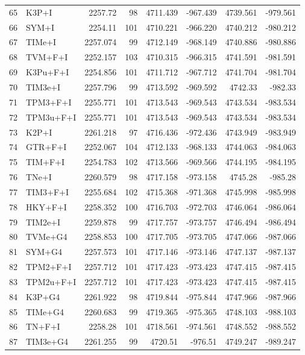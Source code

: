 \documentclass[12pt]{article}
\begin{document}
\begin{longtable}{clrrrrrr}
	65 & K3P+I & 2257.72 & 98 & 4711.439 & -967.439 & 4739.561 & -979.561 \\ 
	66 & SYM+I & 2254.11 & 101 & 4710.221 & -966.220 & 4740.212 & -980.212 \\ 
	67 & TIMe+I & 2257.074 & 99 & 4712.149 & -968.149 & 4740.886 & -980.886 \\ 
	68 & TVM+F+I & 2252.157 & 103 & 4710.315 & -966.315 & 4741.591 & -981.591 \\ 
	69 & K3Pu+F+I & 2254.856 & 101 & 4711.712 & -967.712 & 4741.704 & -981.704 \\ 
	70 & TIM3e+I & 2257.796 & 99 & 4713.592 & -969.592 & 4742.33 & -982.33 \\ 
	71 & TPM3+F+I & 2255.771 & 101 & 4713.543 & -969.543 & 4743.534 & -983.534 \\ 
	72 & TPM3u+F+I & 2255.771 & 101 & 4713.543 & -969.543 & 4743.534 & -983.534 \\ 
	73 & K2P+I & 2261.218 & 97 & 4716.436 & -972.436 & 4743.949 & -983.949 \\ 
	74 & GTR+F+I & 2252.067 & 104 & 4712.133 & -968.133 & 4744.063 & -984.063 \\ 
	75 & TIM+F+I & 2254.783 & 102 & 4713.566 & -969.566 & 4744.195 & -984.195 \\ 
	76 & TNe+I & 2260.579 & 98 & 4717.158 & -973.158 & 4745.28 & -985.28 \\ 
	77 & TIM3+F+I & 2255.684 & 102 & 4715.368 & -971.368 & 4745.998 & -985.998 \\ 
	78 & HKY+F+I & 2258.352 & 100 & 4716.703 & -972.703 & 4746.064 & -986.064 \\ 
	79 & TIM2e+I & 2259.878 & 99 & 4717.757 & -973.757 & 4746.494 & -986.494 \\ 
	80 & TVMe+G4 & 2258.853 & 100 & 4717.705 & -973.705 & 4747.066 & -987.066 \\ 
	81 & SYM+G4 & 2257.573 & 101 & 4717.146 & -973.146 & 4747.137 & -987.137 \\ 
	82 & TPM2+F+I & 2257.712 & 101 & 4717.423 & -973.423 & 4747.415 & -987.415 \\ 
	83 & TPM2u+F+I & 2257.712 & 101 & 4717.423 & -973.423 & 4747.415 & -987.415 \\ 
	84 & K3P+G4 & 2261.922 & 98 & 4719.844 & -975.844 & 4747.966 & -987.966 \\ 
	85 & TIMe+G4 & 2260.683 & 99 & 4719.365 & -975.365 & 4748.103 & -988.103 \\ 
	86 & TN+F+I & 2258.28 & 101 & 4718.561 & -974.561 & 4748.552 & -988.552 \\ 
	87 & TIM3e+G4 & 2261.255 & 99 & 4720.51 & -976.51 & 4749.247 & -989.247 \\ 

\end{longtable}
\end{document}

